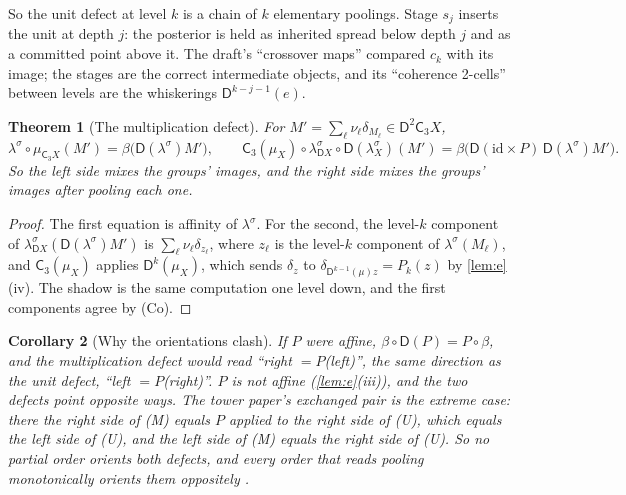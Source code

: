 \documentclass[11pt]{article}
\newtheorem{theorem}{Theorem}[section]
\newtheorem{corollary}[theorem]{Corollary}
\theoremstyle{definition}
\newcommand{\D}{\mathsf D}
\newcommand{\C}{\mathsf C}
\newcommand{\ls}{\lambda^{\sigma}}
\newcommand{\id}{\mathrm{id}}
\begin{document}
So the unit defect at level $k$ is a chain of $k$ elementary poolings. Stage $s_j$ inserts the unit at depth $j$: the posterior is held as
inherited spread below depth $j$ and as a committed point above it. The draft's ``crossover maps'' compared $c_k$ with its image; the
stages are the correct intermediate objects, and its ``coherence 2-cells'' between levels are the whiskerings $\D^{k-j-1}(e)$.

\begin{theorem}[The multiplication defect]\label{thm:mult}
For $M'=\sum_\ell\nu_\ell\delta_{M_\ell}\in\D^2\C_3X$,
\[
\ls\circ\mu_{\C_3X}(M')=\beta\big(\D(\ls)M'\big),\qquad
\C_3(\mu_X)\circ\ls_{\D X}\circ\D(\ls_X)(M')=\beta\big(\D(\id\times P)\,\D(\ls)M'\big).
\]
So the left side mixes the groups' images, and the right side mixes the groups' images after pooling each one.
\end{theorem}
\begin{proof}
The first equation is affinity of $\ls$. For the second, the level-$k$ component of $\ls_{\D X}(\D(\ls)M')$ is $\sum_\ell\nu_\ell\delta_{z_\ell}$,
where $z_\ell$ is the level-$k$ component of $\ls(M_\ell)$, and $\C_3(\mu_X)$ applies $\D^k(\mu_X)$, which sends $\delta_{z}$ to
$\delta_{\D^{k-1}(\mu)z}=P_k(z)$ by \cref{lem:e}(iv). The shadow is the same computation one level down, and the first components
agree by (Co).
\end{proof}

\begin{corollary}[Why the orientations clash]\label{cor:clash}
If $P$ were affine, $\beta\circ\D(P)=P\circ\beta$, and the multiplication defect would read ``right $=P$(left)'', the same direction
as the unit defect, ``left $=P$(right)''. $P$ is not affine (\cref{lem:e}(iii)), and the two defects point opposite ways. The tower
paper's exchanged pair \cite[Prop.~13.17]{Tower} is the extreme case: there the right side of (M) equals $P$ applied to the right side
of (U), which equals the left side of (U), and the left side of (M) equals the right side of (U). So no partial order orients both
defects, and every order that reads pooling monotonically orients them oppositely \cite[Thm.~13.15]{Tower}.
\end{corollary}
\end{document}
